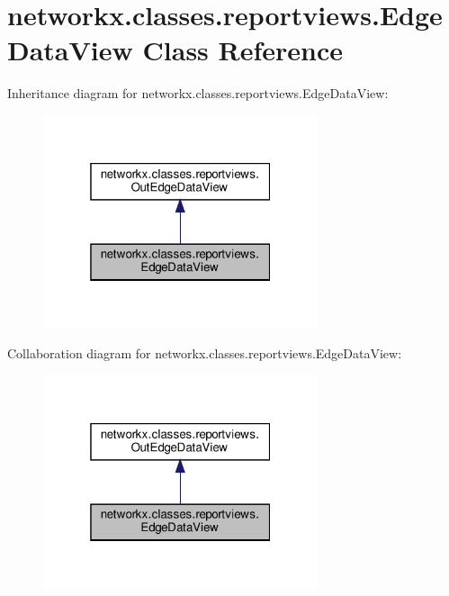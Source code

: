 \hypertarget{classnetworkx_1_1classes_1_1reportviews_1_1EdgeDataView}{}\section{networkx.\+classes.\+reportviews.\+Edge\+Data\+View Class Reference}
\label{classnetworkx_1_1classes_1_1reportviews_1_1EdgeDataView}


Inheritance diagram for networkx.\+classes.\+reportviews.\+Edge\+Data\+View\+:
\nopagebreak
\begin{figure}[H]
\begin{center}
\leavevmode
\includegraphics[width=229pt]{classnetworkx_1_1classes_1_1reportviews_1_1EdgeDataView__inherit__graph}
\end{center}
\end{figure}


Collaboration diagram for networkx.\+classes.\+reportviews.\+Edge\+Data\+View\+:
\nopagebreak
\begin{figure}[H]
\begin{center}
\leavevmode
\includegraphics[width=229pt]{classnetworkx_1_1classes_1_1reportviews_1_1EdgeDataView__coll__graph}
\end{center}
\end{figure}
